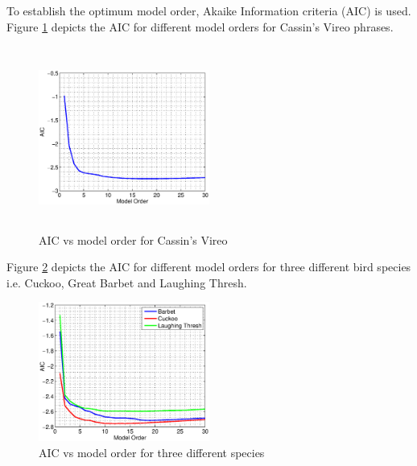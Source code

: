 \documentclass[a4paper]{article}
\begin{document}
 
 To establish the optimum model order, Akaike Information criteria (AIC)  \cite{makhoul} is used. Figure \ref{fig:AIC_cassins} depicts the AIC for different model orders for Cassin's Vireo phrases.  
 
 
 \begin{figure}[!ht]
	\centering
	\includegraphics[width=0.5\textwidth,height=6cm] {cassins_AIC.eps}
	\caption{AIC vs model order for Cassin's Vireo }   
	\label{fig:AIC_cassins}
\end{figure} 

 
 
Figure \ref{fig:AIC_3} depicts the AIC for different model orders for three different bird species i.e. Cuckoo, Great Barbet and Laughing Thresh. 

 \begin{figure}[!ht]
	\centering
	\includegraphics[width=0.5\textwidth,height=7 cm] {model_order_vs_AIC.eps}
	\caption{AIC vs model order for three different species }   
	\label{fig:AIC_3}
\end{figure} 


 
 
 
\end{document}
